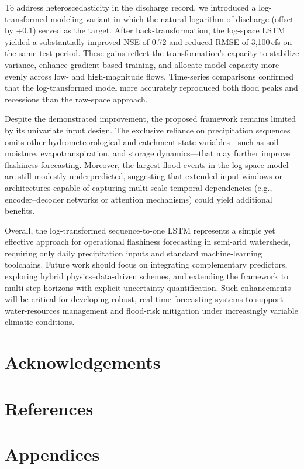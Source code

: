 \documentclass[preprint,12pt]{elsarticle}
\begin{document}
To address heteroscedasticity in the discharge record, we introduced a log-transformed modeling variant in which the natural logarithm of discharge (offset by +0.1) served as the target. After back-transformation, the log-space LSTM yielded a substantially improved NSE of 0.72 and reduced RMSE of 3,100\,cfs on the same test period. These gains reflect the transformation's capacity to stabilize variance, enhance gradient-based training, and allocate model capacity more evenly across low- and high-magnitude flows. Time-series comparisons confirmed that the log-transformed model more accurately reproduced both flood peaks and recessions than the raw-space approach.

Despite the demonstrated improvement, the proposed framework remains limited by its univariate input design. The exclusive reliance on precipitation sequences omits other hydrometeorological and catchment state variables—such as soil moisture, evapotranspiration, and storage dynamics—that may further improve flashiness forecasting. Moreover, the largest flood events in the log-space model are still modestly underpredicted, suggesting that extended input windows or architectures capable of capturing multi-scale temporal dependencies (e.g., encoder--decoder networks or attention mechanisms) could yield additional benefits.

Overall, the log-transformed sequence-to-one LSTM represents a simple yet effective approach for operational flashiness forecasting in semi-arid watersheds, requiring only daily precipitation inputs and standard machine-learning toolchains. Future work should focus on integrating complementary predictors, exploring hybrid physics–data-driven schemes, and extending the framework to multi-step horizons with explicit uncertainty quantification. Such enhancements will be critical for developing robust, real-time forecasting systems to support water-resources management and flood-risk mitigation under increasingly variable climatic conditions.

\section*{Acknowledgements}

\section*{References}

\section*{Appendices}



\end{document}
